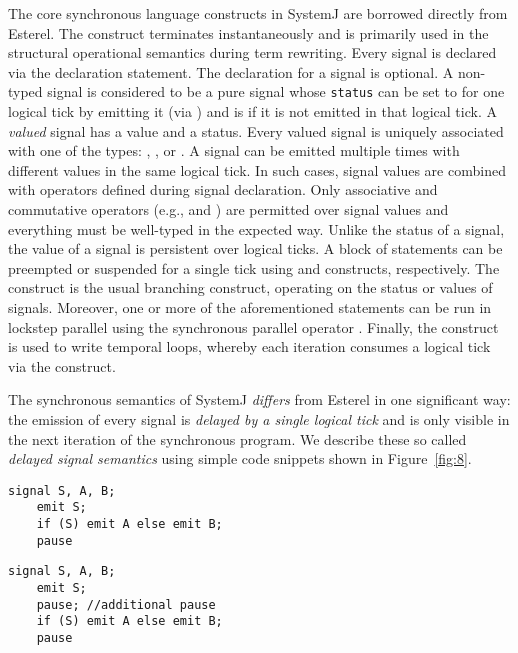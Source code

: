 \documentclass[10pt,journal,cspaper,compsoc]{IEEEtran}
\begin{document}
The core synchronous language constructs in SystemJ are borrowed
directly from Esterel. The  construct terminates
instantaneously and is primarily used in the structural operational
semantics during term rewriting. Every signal is declared via the
 declaration statement. The  declaration for a
signal is optional. A non-typed signal is considered to be a pure signal
whose \texttt{status} can be set to  for one logical tick by
emitting it (via ) and is  if it is not emitted in
that logical tick. A \textit{valued} signal has a value and a
status. Every valued signal is uniquely associated with one of the
types: , , or . A
signal can be emitted multiple times with different values in the same
logical tick. In such cases, signal values are combined with operators
defined during signal declaration. Only associative and commutative
operators (e.g.,  and ) are permitted over
signal values and everything must be well-typed in the expected
way. Unlike the status of a signal, the value of a signal is persistent
over logical ticks. A block of statements can be preempted or suspended
for a single tick using  and 
constructs, respectively. The  construct is the usual
branching construct, operating on the status or values of
signals. Moreover, one or more of the aforementioned statements can be
run in lockstep parallel using the synchronous parallel operator .
Finally, the  construct is used to write temporal loops,
whereby each iteration consumes a logical tick via the 
construct.

The synchronous semantics of SystemJ \textit{differs} from Esterel in
one significant way: the emission of every signal is \textit{delayed by
  a single logical tick} and is only visible in the next iteration of
the synchronous program. We describe these so called \textit{delayed
  signal semantics} using simple code snippets shown in
Figure~\ref{fig:8}.

\newbox{\csf}
\begin{lrbox}{\csf}
  \begin{lstlisting}[style=sysj,morekeywords={signal,loop,abort,await,emit,present,trap,pause,exit,delay,suspend}]
    signal S, A, B;
    emit S; 
    if (S) emit A else emit B;
    pause
  \end{lstlisting}
\end{lrbox}

\newbox{\css}
\begin{lrbox}{\css}
  \begin{lstlisting}[style=sysj,morekeywords={signal,loop,abort,await,emit,present,trap,pause,exit,delay,suspend}]
    signal S, A, B;
    emit S; 
    pause; //additional pause 
    if (S) emit A else emit B;
    pause
  \end{lstlisting}
\end{lrbox}
\end{document}
